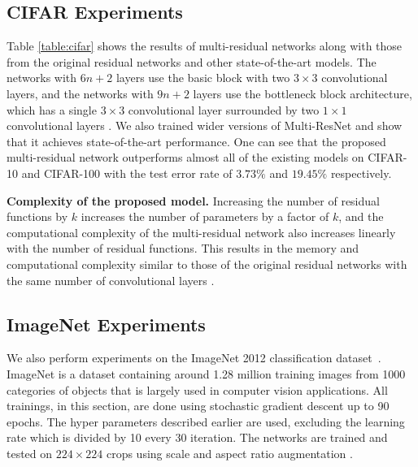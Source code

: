 \documentclass[journal]{IEEEtran}
\begin{document}
\subsection{CIFAR Experiments}%


Table \ref{table:cifar} shows the results of  multi-residual networks along with those from the original residual networks  and other state-of-the-art models. The networks with $6n+2$ layers use the basic block with two $3\times 3$ convolutional layers, and the networks with $9n+2$ layers use the bottleneck block architecture, which has a single $3\times 3$ convolutional layer surrounded by two $1\times 1$ convolutional layers \cite{he2015deep}. We also trained wider  \cite{zagoruyko2016wide} versions of Multi-ResNet and show that it achieves state-of-the-art performance. One can see that the proposed multi-residual network outperforms almost all of the existing models on CIFAR-10 and CIFAR-100 with the test error rate of $3.73\%$ and $19.45\%$ respectively. 





\textbf{Complexity of the proposed model.} Increasing the number of residual functions by $k$ increases the number of parameters by a factor of $k$, and  the computational complexity of the multi-residual network also increases linearly with the number of residual functions. This results in the memory and computational complexity similar to those of the original residual networks with the same number of convolutional layers \cite{he2016identity}.


\subsection{ImageNet Experiments}

We also perform experiments on the ImageNet 2012 classification dataset~\cite{ILSVRC15}. ImageNet is a dataset containing around 1.28 million training images from 1000 categories of objects that is largely used in computer vision applications. All trainings, in this section, are done using stochastic gradient descent up to 90 epochs. The hyper parameters described earlier are used, excluding the learning rate which is divided by 10 every 30 iteration. The networks are trained and tested on $224\times 224$ crops using scale and aspect ratio augmentation \cite{he2016identity,szegedy2015going}.%
\end{document}
